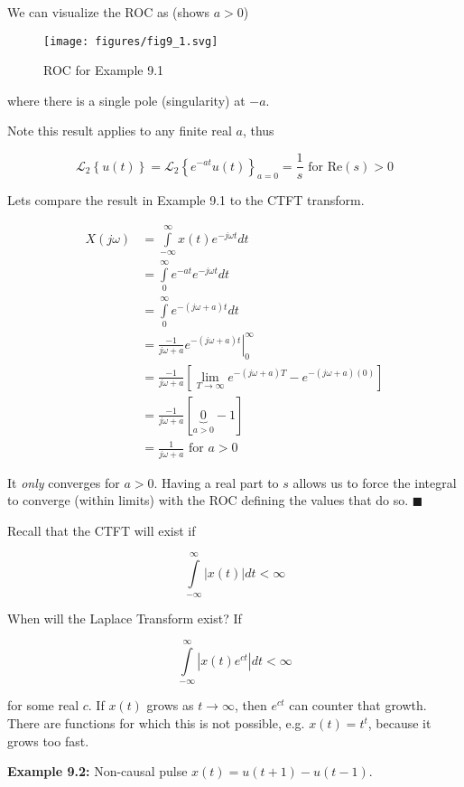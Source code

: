 \documentclass{article}
\begin{document}
We can visualize the ROC as (shows $a > 0$)

\begin{figure}
  \centering
  \texttt{[image: figures/fig9\_1.svg]}
  \caption{ROC for Example 9.1}
\end{figure}

where there is a single pole (singularity) at $-a$.

Note this result applies to any finite real $a$, thus

\[
\mathcal{L}_2\left\{ u(t) \right\} = \mathcal{L}_2\left\{ e^{-at} u(t) \right\}_{a = 0} = \frac{1}{s} \text{ for Re}(s) > 0 
\]

Lets compare the result in Example 9.1 to the CTFT transform.

\begin{align}
  X(j\omega) &= \int\limits_{-\infty}^{\infty} x(t) e^{-j\omega t} dt\\
  &= \int\limits_{0}^{\infty} e^{-at} e^{-j\omega t} dt\\
  &= \int\limits_{0}^{\infty} e^{-(j\omega+a)t} dt\\
  &= \left. \frac{-1}{j\omega+a} e^{-(j\omega+a)t} \right|_{0}^{\infty}\\
  &= \frac{-1}{j\omega+a} \left[\lim_{T\rightarrow \infty} e^{-(j\omega+a)T} - e^{-(j\omega+a)(0)} \right]\\
  &= \frac{-1}{j\omega+a} \left[\underbrace{0}_{a > 0} - 1\right]\\
  &= \frac{1}{j\omega+a} \text{ for } a > 0
\end{align}

It \textit{only} converges for $a > 0$. Having a real part to $s$ allows us to force the integral to converge (within limits) with the ROC defining the values that do so. $\blacksquare$



Recall that the CTFT will exist if

\[
\int\limits_{-\infty}^{\infty}\left| x(t) \right| dt < \infty 
\]

When will the Laplace Transform exist? If

\[
\int\limits_{-\infty}^{\infty}\left| x(t)e^{ct} \right| dt < \infty 
\]

for some real $c$. If $x(t)$ grows as $t\rightarrow \infty$, then $e^{ct}$ can counter that growth. There are functions for which this is not possible, e.g. $x(t) = t^t$, because it grows too fast.

\textbf{Example 9.2:} Non-causal pulse $x(t) = u(t+1) - u(t-1)$.
\end{document}
